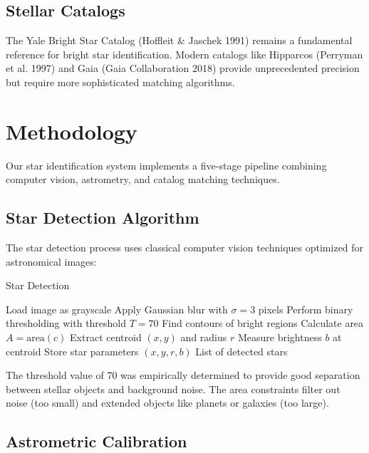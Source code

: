 \documentclass[11pt,a4paper]{article}
\begin{document}
\subsection{Stellar Catalogs}

The Yale Bright Star Catalog (Hoffleit \& Jaschek 1991) \cite{ybc} remains a fundamental reference for bright star identification. Modern catalogs like Hipparcos (Perryman et al. 1997) \cite{hipparcos} and Gaia (Gaia Collaboration 2018) \cite{gaia} provide unprecedented precision but require more sophisticated matching algorithms.

\section{Methodology}

Our star identification system implements a five-stage pipeline combining computer vision, astrometry, and catalog matching techniques.

\subsection{Star Detection Algorithm}

The star detection process uses classical computer vision techniques optimized for astronomical images:

\begin{algorithm}
\caption{Star Detection}
\begin{algorithmic}[1]
\STATE Load image as grayscale
\STATE Apply Gaussian blur with $\sigma = 3$ pixels
\STATE Perform binary thresholding with threshold $T = 70$
\STATE Find contours of bright regions
    \STATE Calculate area $A = \text{area}(c)$
        \STATE Extract centroid $(x, y)$ and radius $r$
        \STATE Measure brightness $b$ at centroid
        \STATE Store star parameters $(x, y, r, b)$
    \ENDIF
\ENDFOR
\RETURN List of detected stars
\end{algorithmic}
\end{algorithm}

The threshold value of 70 was empirically determined to provide good separation between stellar objects and background noise. The area constraints filter out noise (too small) and extended objects like planets or galaxies (too large).

\subsection{Astrometric Calibration}
\end{document}
